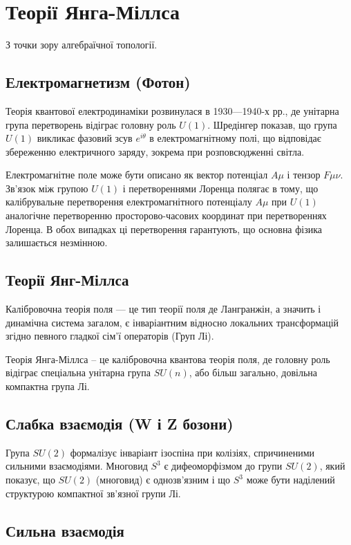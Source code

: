 \section{Теорії Янга-Міллса}

З точки зору алгебраїчної топології.

\subsection*{Електромагнетизм (Фотон)}

Теорія квантової електродинаміки розвинулася в 1930—1940-х рр.,
де унітарна група перетворень відіграє головну роль $U(1)$.
Шредінгер показав, що група $U(1)$ викликає фазовий
зсув $e^{i\theta}$ в електромагнітному полі,
що відповідає збереженню електричного заряду, зокрема при
розповсюдженні світла.

Електромагнітне поле може бути описано як вектор
потенціал $A\mu$ і тензор $F\mu\nu$. Зв'язок між групою $U(1)$
і перетвореннями Лоренца полягає в тому, що калібрувальне
перетворення електромагнітного потенціалу $A\mu$ при $U(1)$
аналогічне перетворенню просторово-часових координат при
перетвореннях Лоренца. В обох випадках ці перетворення
гарантують, що основна фізика залишається незмінною.

\subsection*{Теорії Янг-Міллса}

Калібровочна теорія поля --- це тип теорії поля де
Лангранжін, а значить і динамічна система загалом,
є інваріантним відносно локальних трансформацій
згідно певного гладкої сім'ї операторів (Груп Лі).

Теорія Янга-Міллса -- це калібровочна квантова теорія поля,
де головну роль відіграє спеціальна унітарна група $SU(n)$,
або більш загально, довільна компактна група Лі.

\subsection*{Слабка взаємодія (W і Z бозони)}

Група $SU(2)$ формалізує інваріант ізоспіна при колізіях,
спричиненими сильними взаємодіями.
Многовид $S^3$ є дифеоморфізмом до групи $SU(2)$,
який показує, що $SU(2)$ (многовид) є однозв'язним і що $S^3$
може бути наділений структурою компактної зв'язної групи Лі.

\subsection*{Сильна взаємодія}

